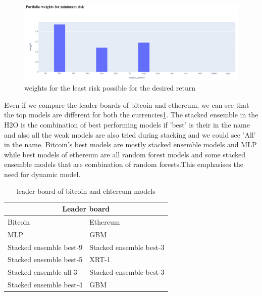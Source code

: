 \documentclass[final]{cvpr}
\begin{document}
\begin{figure}[h!]
\begin{center}
\includegraphics[width=0.8\linewidth]{latex/portfolio_min.PNG}
\end{center}
   \caption{weights for the least risk possible for the desired return}
\label{fig:weights}
\end{figure}


Even if we compare the leader boards of bitcoin and ethereum, we can see that the top models are different for both the currencies\ref{tab:leader}. The stacked ensemble in the H2O is the combination of best performing models if 'best' is their in the name and also all the weak models are also tried during stacking and we could see 'All' in the name. Bitcoin's best models are mostly stacked ensemble models and MLP while best models of ethereum are all random forest models and some stacked ensemble models that are combination of random forests.This emphasises the need for dynamic model.

\begin{table}[h!]
\centering
 \begin{tabular}{ |p{2.5cm}|p{2.5cm}|}
 \hline
 \multicolumn{2}{|c|}{\textbf{Leader board}} \\
 \hline
 Bitcoin & Ethereum \\
 \hline
 MLP  & GBM \\
 \hline
 Stacked ensemble best-9 & Stacked ensemble best-3 \\
 \hline
  Stacked ensemble best-5 &  XRT-1 \\
 \hline
  Stacked ensemble all-3 &   Stacked ensemble best-3\\
 \hline
  Stacked ensemble best-4&   GBM\\
 \hline
  \end{tabular}
  \caption{leader board of bitcoin and ehtereum models}
 \label{tab:leader}
\end{table}
\end{document}
